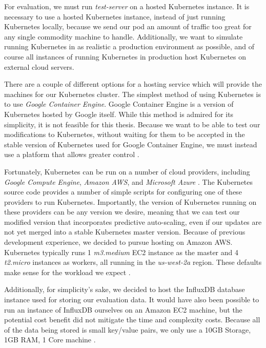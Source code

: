 For evaluation, we must run \textit{test-server} on a hosted Kubernetes
instance. It is necessary to use a hosted Kubernetes instance, instead of just
running Kubernetes locally, because we send our pod an amount of
traffic too great for any single commodity machine to handle. Additionally, we
want to simulate running Kubernetes in as realistic a production environment as
possible, and of course all instances of running Kubernetes in production
host Kubernetes on external cloud servers.

There are a couple of different options for a hosting service which will provide
the machines for our Kubernetes cluster. The simplest method
of using Kubernetes is to use \textit{Google Container
Engine}. Google Container Engine is a version of Kubernetes hosted by Google
itself. While this method is admired for its simplicity, it is not
feasible for this thesis. Because we want to be able to test our modifications
to Kubernetes, without waiting for them to be accepted in the stable version of
Kubernetes used for Google Container Engine, we must instead use a platform that
allows greater control \cite{getting-started-k8s}.

Fortunately, Kubernetes can be run on a number of cloud providers, including
\textit{Google Compute Engine}, \textit{Amazon AWS}, and \textit{Microsoft
Azure} \cite{getting-started-k8s}.
The Kubernetes source code provides a number of simple scripts for
configuring one of these providers to run Kubernetes. Importantly, the version
of Kubernetes running on these providers can be any version we desire, meaning
that we can test our modified version that incorporates predictive auto-scaling,
even if our updates are not yet merged into a stable Kubernetes master version.
Because of previous development experience, we decided to
pursue hosting on Amazon AWS. Kubernetes typically runs 1 \textit{m3.medium}
EC2 instance as the master and 4 \textit{t2.micro} instances as workers, all
running in the \textit{us-west-2a} region. These defaults make
sense for the workload we expect \cite{getting-started-k8s-aws}.

Additionally, for simplicity's sake, we decided to host the InfluxDB database
instance used for storing our evaluation data. It would have also been possible
to run an instance of InfluxDB ourselves on an Amazon EC2 machine, but the
potential cost benefit did not mitigate the time and complexity costs. Because
all of the data being stored is small key/value pairs, we only use a 10GB
Storage, 1GB RAM, 1 Core machine \cite{influxdb-pricing}.
